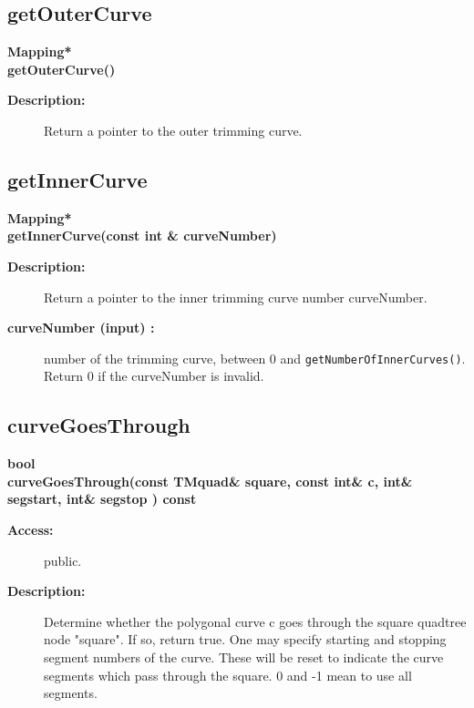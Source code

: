 \subsection{getOuterCurve}
 
\begin{flushleft} \textbf{%
Mapping*  \\ 
\settowidth{\TrimmedMappingIncludeArgIndent}{getOuterCurve(}%
getOuterCurve()
}\end{flushleft}
\begin{description}
\item[{\bf Description:}] 
   Return a pointer to the outer trimming curve.
\end{description}
\subsection{getInnerCurve}
 
\begin{flushleft} \textbf{%
Mapping*  \\ 
\settowidth{\TrimmedMappingIncludeArgIndent}{getInnerCurve(}%
getInnerCurve(const int \& curveNumber)
}\end{flushleft}
\begin{description}
\item[{\bf Description:}] 
   Return a pointer to the inner trimming curve number curveNumber.
\item[{\bf curveNumber (input) :}]  number of the trimming curve, between 0 and {\tt getNumberOfInnerCurves()}.
         Return 0 if the curveNumber is invalid.
\end{description}
\subsection{curveGoesThrough}
 
\begin{flushleft} \textbf{%
bool  \\ 
\settowidth{\TrimmedMappingIncludeArgIndent}{curveGoesThrough(}%
curveGoesThrough(const TMquad\& square, const int\& c, int\& segstart, int\& segstop ) const
}\end{flushleft}
\begin{description}
\item[{\bf Access:}]  public.
\item[{\bf Description:}] 

  Determine whether the polygonal curve c goes through the square quadtree
 node "square".  If so, return true.
 One may specify starting and stopping segment numbers of the curve.
 These will be reset to indicate the curve segments which pass through
 the square.  0 and -1 mean to use all segments.

\end{description}
